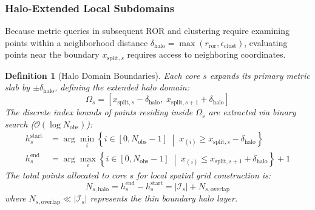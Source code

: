 \documentclass[journal,compsoc]{IEEEtran}
\newtheorem{definition}{Definition}
\begin{document}
\subsubsection{Halo-Extended Local Subdomains}
Because metric queries in subsequent ROR and clustering require examining points within a neighborhood distance $\delta_{\text{halo}} = \max(r_{\text{ror}}, \epsilon_{\text{clust}})$, evaluating points near the boundary $x_{\text{split}, s}$ requires access to neighboring coordinates. 
\begin{definition}[Halo Domain Boundaries]
Each core $s$ expands its primary metric slab by $\pm \delta_{\text{halo}}$, defining the extended halo domain:
\begin{equation}
\Omega_s = \left[ x_{\text{split}, s} - \delta_{\text{halo}}, \; x_{\text{split}, s+1} + \delta_{\text{halo}} \right]
\label{eq:halo_domain}
\end{equation}
The discrete index bounds of points residing inside $\Omega_s$ are extracted via binary search ($\mathcal{O}(\log N_{\text{obs}})$):
\begin{align}
h_s^{\text{start}} &= \arg\min_i \left\{ i \in [0, N_{\text{obs}}-1] \;\middle|\; x_{(i)} \ge x_{\text{split}, s} - \delta_{\text{halo}} \right\} \\
h_s^{\text{end}} &= \arg\max_i \left\{ i \in [0, N_{\text{obs}}-1] \;\middle|\; x_{(i)} \le x_{\text{split}, s+1} + \delta_{\text{halo}} \right\} + 1
\end{align}
The total points allocated to core $s$ for local spatial grid construction is:
\begin{equation}
N_{s, \text{halo}} = h_s^{\text{end}} - h_s^{\text{start}} = |\mathcal{I}_s| + N_{s, \text{overlap}}
\end{equation}
where $N_{s, \text{overlap}} \ll |\mathcal{I}_s|$ represents the thin boundary halo layer.
\end{definition}
\end{document}
